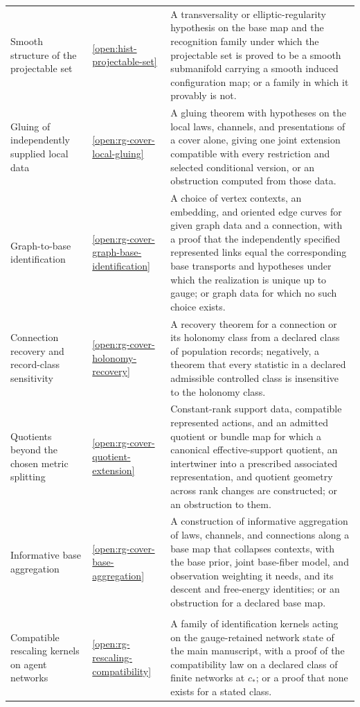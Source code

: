 {\begin{longtable}{@{}>{\raggedright\arraybackslash}p{}
>{\raggedright\arraybackslash}p{}
>{\raggedright\arraybackslash}p{}@{}}
Smooth structure of the projectable set & \cref{open:hist-projectable-set} & A transversality or elliptic-regularity hypothesis on the base map and the recognition family under which the projectable set is proved to be a smooth submanifold carrying a smooth induced configuration map; or a family in which it provably is not. \\
Gluing of independently supplied local data & \cref{open:rg-cover-local-gluing} & A gluing theorem with hypotheses on the local laws, channels, and presentations of a cover alone, giving one joint extension compatible with every restriction and selected conditional version, or an obstruction computed from those data. \\
Graph-to-base identification & \cref{open:rg-cover-graph-base-identification} & A choice of vertex contexts, an embedding, and oriented edge curves for given graph data and a connection, with a proof that the independently specified represented links equal the corresponding base transports and hypotheses under which the realization is unique up to gauge; or graph data for which no such choice exists. \\
Connection recovery and record-class sensitivity & \cref{open:rg-cover-holonomy-recovery} & A recovery theorem for a connection or its holonomy class from a declared class of population records; negatively, a theorem that every statistic in a declared admissible controlled class is insensitive to the holonomy class. \\
Quotients beyond the chosen metric splitting & \cref{open:rg-cover-quotient-extension} & Constant-rank support data, compatible represented actions, and an admitted quotient or bundle map for which a canonical effective-support quotient, an intertwiner into a prescribed associated representation, and quotient geometry across rank changes are constructed; or an obstruction to them. \\
Informative base aggregation & \cref{open:rg-cover-base-aggregation} & A construction of informative aggregation of laws, channels, and connections along a base map that collapses contexts, with the base prior, joint base-fiber model, and observation weighting it needs, and its descent and free-energy identities; or an obstruction for a declared base map. \\
\multicolumn{3}{@{}l}{\textbf{Part B-II: infinite networks and Wilsonian asymptotics}} \\
Compatible rescaling kernels on agent networks & \cref{open:rg-rescaling-compatibility} & A family of identification kernels acting on the gauge-retained network state of the main manuscript, with a proof of the compatibility law on a declared class of finite networks at $c_*$; or a proof that none exists for a stated class. \\

\end{longtable}}

